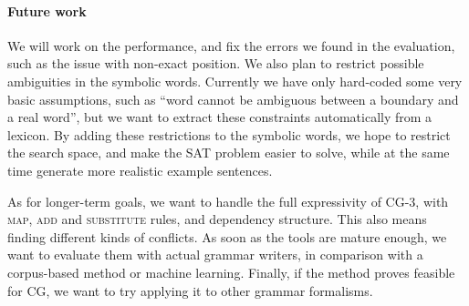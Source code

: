 




\paragraph{Future work} 

We will work on the performance, and fix the errors we found in the
evaluation, such as the issue with non-exact position.
We also plan to restrict possible ambiguities in the symbolic words. 
Currently we have only hard-coded some
very basic assumptions, such as ``word cannot be ambiguous between a
boundary and a real word'', but we want to extract these constraints
automatically from a lexicon.
By adding these restrictions to the symbolic words, we hope to
restrict the search space, and make the SAT problem easier to solve, while at the same time generate more realistic example sentences.

As for longer-term goals, we want to handle the full expressivity of CG-3,
with \textsc{map}, \textsc{add} and \textsc{substitute} rules, and
dependency structure. This also means finding different kinds of conflicts.
As soon as the tools are mature enough, we want to
evaluate them with actual grammar writers,
in comparison with a corpus-based method or machine learning.
Finally, if the method proves feasible for CG, we want
to try applying it to other grammar formalisms.



